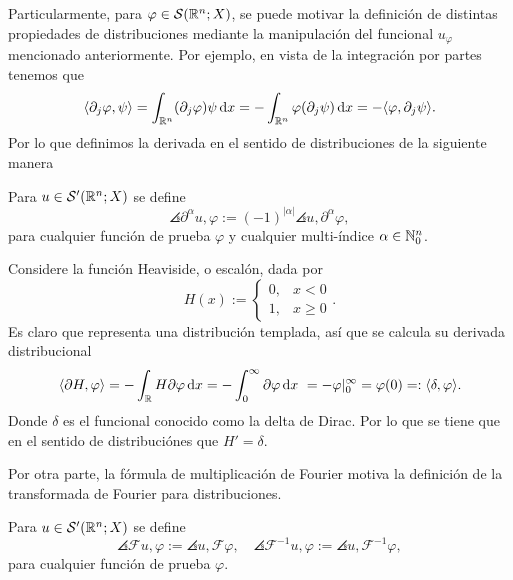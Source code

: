 Particularmente, para $\varphi\in\mathcal{S}(\mathbb{R}^n;X)$, se puede motivar la 
definición de distintas propiedades de distribuciones mediante la manipulación 
del funcional $u_\varphi$ mencionado anteriormente. Por ejemplo, en vista de
la integración por partes tenemos que 
\begin{equation*}
    \langle\partial_j\varphi, \psi\rangle = \int_{\mathbb{R}^n} (\partial_j\varphi) \psi\mathop{}\!\mathrm{d} x
    = - \int_{\mathbb{R}^n} \varphi(\partial_j \psi)\mathop{}\!\mathrm{d} x = - \langle\varphi,\partial_j
    \psi\rangle.
\end{equation*}
Por lo que definimos la derivada en el sentido de distribuciones de la 
siguiente manera
\begin{definition}
    Para $u\in\mathcal{S}'(\mathbb{R}^n;X)$ se define
    \begin{equation*}
    	\angles{\partial^\alpha u, \varphi} := (-1)^{|\alpha|} \angles{u, \partial^\alpha\varphi},
    \end{equation*}
    para cualquier función de prueba $\varphi$ y cualquier multi-índice $\alpha\in\mathbb{N}_0^n$. 
\end{definition}
\begin{example}
	Considere la función Heaviside, o escalón, dada por
	\begin{equation*}
		H(x) := \begin{cases} 0, &  x <0 \\
			1,  &x \geq 0\end{cases}.
	\end{equation*}
	Es claro que representa una distribución templada, así que se calcula su derivada distribucional
	\begin{align*}
		\langle\partial H, \varphi\rangle = - \int_{\mathbb{R}} H\partial\varphi\mathop{}\!\mathrm{d} x  = -\int_0^\infty \partial\varphi\mathop{}\!\mathrm{d} x \ = -\varphi|_0^\infty  = \varphi(0) =: \langle\delta, \varphi\rangle.
	\end{align*}
	Donde $\delta$ es el funcional conocido como la delta de Dirac. Por lo que se tiene que en el sentido de distribuciónes que $ H' = \delta$.
\end{example}
Por otra parte, la fórmula de multiplicación de Fourier motiva la definición de la transformada de Fourier para distribuciones.
\begin{definition}
	Para $u\in\mathcal{S}'(\mathbb{R}^n;X)$ se define 
	\begin{equation*}
		\angles{\mathcal{F}u, \varphi} := \angles{u, \mathcal{F}\varphi}, \quad 
		\angles{\mathcal{F}^{-1}u, \varphi} := \angles{u, \mathcal{F}^{-1}\varphi},
	\end{equation*}
	para cualquier función de prueba $\varphi$.
\end{definition}
